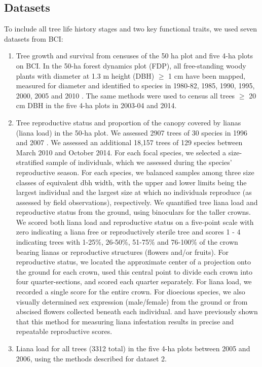 \documentclass[b5paper,justified]{tufte-book} %
\begin{document}
\begin{fullwidth}
\subsection{Datasets}
To include all tree life history stages and two key functional traits, we used seven datasets from BCI: 
\begin{enumerate}
\item Tree growth and survival from censuses of the 50 ha plot and five 4-ha plots on BCI. In the 50-ha forest dynamics plot (FDP), all free-standing woody plants with diameter at 1.3 m height (DBH) $\geq$ 1 cm have been mapped, measured for diameter and identified to species in 1980-82, 1985, 1990, 1995, 2000, 2005 and 2010 \citep{Hubbell1983}. The same methods were used to census all trees $\geq$ 20 cm DBH in the five 4-ha plots in 2003-04 and 2014. 
\item Tree reproductive status and proportion of the canopy covered by lianas (liana load) in the 50-ha plot. We assessed 2907 trees of 30 species in 1996 and 2007 \citep{Wright2005, Ingwell2010}. We assessed an additional 18,157 trees of 129 species between March 2010 and October 2014. For each focal species, we selected a size-stratified sample of individuals, which we assessed during the species' reproductive season. For each species, we balanced samples among three size classes of equivalent dbh width, with the upper and lower limits being the largest individual and the largest size at which no individuals reproduce (as assessed by field observations), respectively. We quantified tree liana load and reproductive status from the ground, using binoculars for the taller crowns. We scored both liana load and reproductive status on a five-point scale with zero indicating a liana free or reproductively sterile tree and scores 1 - 4 indicating trees with 1-25\%, 26-50\%, 51-75\% and 76-100\% of the crown bearing lianas or reproductive structures (flowers and/or fruits). For reproductive status, we located the approximate center of a projection onto the ground for each crown, used this central point to divide each crown into four quarter-sections, and scored each quarter separately. For liana load, we recorded a single score for the entire crown. For dioecious species, we also visually determined sex expression (male/female) from the ground or from abscised flowers collected beneath each individual. \citet{Ingwell2010} and \citet{Wright2015} have previously shown that this method for measuring liana infestation results in precise and repeatable reproductive scores. 
\item Liana load for all trees (3312 total) in the five 4-ha plots between 2005 and 2006, using the methods described for dataset 2. 

\end{enumerate}
\end{fullwidth}
\end{document}
